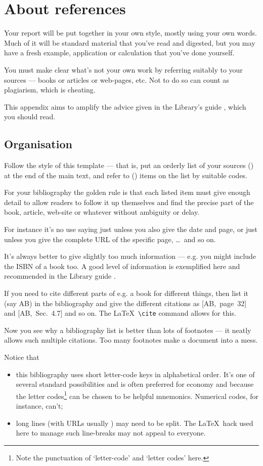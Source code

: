 \chapter{About references}\label{app:refs}
Your report will be put together in your own style, mostly using your
own words. Much of it will be standard material that you've read and
digested, but you may have a fresh example, application or calculation
that you've done yourself.
\par
You must make clear what's not your own work by referring suitably
to your sources --- books or articles or web-pages, etc. Not to do so
can count as plagiarism, which is cheating.
\par
This appendix aims to amplify the advice given in the
Library's guide \cite{BR}, which you should read.
\section{Organisation}
Follow the style of this template --- that is, put an orderly list of
your sources () at the end of the main text,
and refer to () items on the list by suitable codes.
\par
For your bibliography the golden rule is that each listed item must give
enough detail to allow readers to follow it up themselves and find the
precise part of the book, article, web-site or whatever without
ambiguity or delay.
\par
For instance it's no use saying just  unless
you also give the date and page, or just  unless you
give the complete URL of the specific page, \dots\ and so on.
\par
It's always better to give slightly too much information --- e.g. you
might include the ISBN of a book too. A good level of information is
exemplified here and recommended in the Library guide \cite{BR}.
\par
If you need to cite different parts of e.g. a book for different things,
then list it (say AB) in the bibliography and give the different
citations as [AB,~page~32] and [AB,~Sec.~4.7] and so on. The \LaTeX\
\verb+\cite+ command allows for this.
\par
Now you see why a bibliography list is better than lots of footnotes
--- it neatly allows such multiple citations. Too many footnotes make a
document into a mess.
\par
Notice that\begin{itemize}\item this bibliography uses short letter-code
keys in alphabetical order. It's one of several standard possibilities
\cite{BR} and is often preferred for economy and because the letter
codes\footnote{Note the punctuation of \lq letter-code' and \lq letter
codes' here.} can be chosen to be helpful mnemonics. Numerical codes,
for instance, can't;
\item long lines (with URLs usually \cite{IM,PS}) may need to be split.
The \LaTeX\ hack used here to manage such line-breaks may not appeal to
everyone.\end{itemize}
